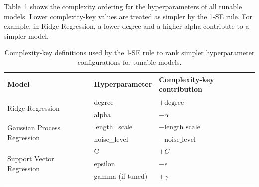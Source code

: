 Table~\ref{tab:complexity-key-hyperparameters} shows the complexity ordering for the hyperparameters of all tunable models. Lower complexity-key values are treated as simpler by the 1-SE rule. For example, in Ridge Regression, a lower degree and a higher alpha contribute to a simpler model.

\begin{table}[t]
	\centering
	\caption{
		\centering
		Complexity-key definitions used by the 1-SE rule to rank simpler hyperparameter configurations for tunable models.
	}
	\label{tab:complexity-key-hyperparameters}
	\begin{tabular}{lll}
		\toprule
		Model & Hyperparameter   & Complexity-key contribution \\
		\midrule
		\multirow{2}{*}{Ridge Regression}
		      & degree           & $+\text{degree}$            \\
		      & alpha            & $-\alpha$                   \\
		\midrule
		\multirow{2}{*}{Gaussian Process Regression}
		      & length\_scale    & $-\text{length\_scale}$     \\
		      & noise\_level     & $-\text{noise\_level}$      \\
		\midrule
		\multirow{3}{*}{Support Vector Regression}
		      & C                & $+C$                        \\
		      & epsilon          & $-\epsilon$                 \\
		      & gamma (if tuned) & $+\gamma$                   \\
		\bottomrule
	\end{tabular}
\end{table}

